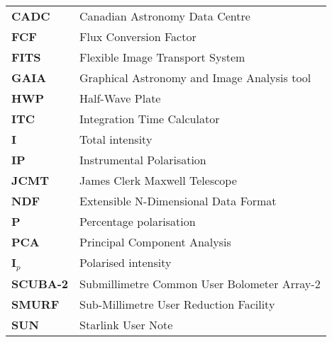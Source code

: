 \documentclass[11pt,oneside,chapters]{starlink}
\begin{document}
\scfrontmatter





\Acronyms

\begin{table}[h!]
\begin{tabular}{ll}
\textbf{CADC}   & Canadian Astronomy Data Centre\\
\textbf{FCF}    & Flux Conversion Factor\\
\textbf{FITS}   & Flexible Image Transport System\\
\textbf{GAIA}   & Graphical Astronomy and Image Analysis tool\\
\textbf{HWP}    & Half-Wave Plate\\
\textbf{ITC}    & Integration Time Calculator\\
\textbf{I}      & Total intensity \\
\textbf{IP}     & Instrumental Polarisation \\
\textbf{JCMT}   & James Clerk Maxwell Telescope\\
\textbf{NDF}    & Extensible N-Dimensional Data Format\\
\textbf{P}      & Percentage polarisation \\
\textbf{PCA}    & Principal Component Analysis \\
\textbf{I$_{p}$}     & Polarised intensity \\
\textbf{SCUBA-2}& Submillimetre Common User Bolometer Array-2\\
\textbf{SMURF}  & Sub-Millimetre User Reduction Facility\\
\textbf{SUN}    & Starlink User Note\\
\end{tabular}
\end{table}
\end{document}
